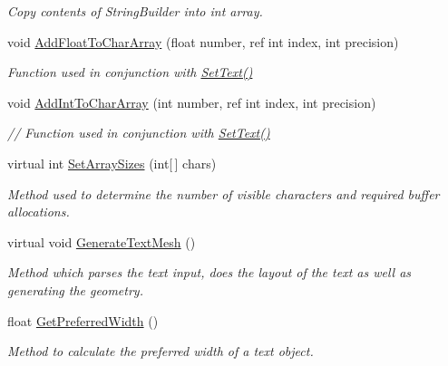 \begin{DoxyCompactItemize}
\begin{DoxyCompactList}\small\item\em Copy contents of String\+Builder into int array. \end{DoxyCompactList}\item 
void \mbox{\hyperlink{class_t_m_pro_1_1_t_m_p___text_a32135c2eacb2501a4d6878519b7b067c}{Add\+Float\+To\+Char\+Array}} (float number, ref int index, int precision)
\begin{DoxyCompactList}\small\item\em Function used in conjunction with \mbox{\hyperlink{class_t_m_pro_1_1_t_m_p___text_a8aebc83540d494fd574a92470762fdaa}{Set\+Text()}} \end{DoxyCompactList}\item 
void \mbox{\hyperlink{class_t_m_pro_1_1_t_m_p___text_a24fb40919f23e2f0aa0261008731beca}{Add\+Int\+To\+Char\+Array}} (int number, ref int index, int precision)
\begin{DoxyCompactList}\small\item\em // Function used in conjunction with \mbox{\hyperlink{class_t_m_pro_1_1_t_m_p___text_a8aebc83540d494fd574a92470762fdaa}{Set\+Text()}} \end{DoxyCompactList}\item 
virtual int \mbox{\hyperlink{class_t_m_pro_1_1_t_m_p___text_afb0b5462b35a2486f6e976c2a278702f}{Set\+Array\+Sizes}} (int\mbox{[}$\,$\mbox{]} chars)
\begin{DoxyCompactList}\small\item\em Method used to determine the number of visible characters and required buffer allocations. \end{DoxyCompactList}\item 
virtual void \mbox{\hyperlink{class_t_m_pro_1_1_t_m_p___text_a537ab0215d185079796cc94a455d2cdc}{Generate\+Text\+Mesh}} ()
\begin{DoxyCompactList}\small\item\em Method which parses the text input, does the layout of the text as well as generating the geometry. \end{DoxyCompactList}\item 
float \mbox{\hyperlink{class_t_m_pro_1_1_t_m_p___text_abb5c80b9a45b89007024c857593e12c8}{Get\+Preferred\+Width}} ()
\begin{DoxyCompactList}\small\item\em Method to calculate the preferred width of a text object. \end{DoxyCompactList}\item 

\end{DoxyCompactItemize}
